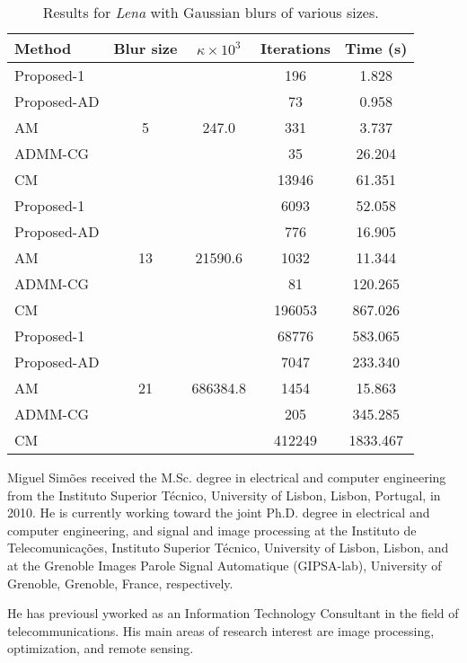 \documentclass[10pt,twocolumn,twoside]{IEEEtran}
\begin{document}
\begin{table}[h]
	\renewcommand{\arraystretch}{1}
	\caption{Results for \textit{Lena} with Gaussian blurs of various sizes.}
	\centering
\begin{tabular}{l|c|c|c|c}
Method &Blur size &$\kappa \times 10^3$ &Iterations &Time (s) \\
\hline
Proposed-1 & \multirow{5}{*}{5} & \multirow{5}{*}{247.0} &  196 & 1.828  \\
Proposed-AD & & &   73 & 0.958 \\
AM & & &  331 & 3.737 \\
ADMM-CG & & &   35 & 26.204 \\
CM & & & 13946 & 61.351 \\
\hline
Proposed-1 & \multirow{5}{*}{13} & \multirow{5}{*}{21590.6} & 6093 & 52.058  \\
Proposed-AD & & &  776 & 16.905 \\
AM & & & 1032 & 11.344 \\
ADMM-CG & & &   81 & 120.265 \\
CM & & & 196053 & 867.026 \\
\hline
Proposed-1 & \multirow{5}{*}{21} & \multirow{5}{*}{686384.8} & 68776 & 583.065  \\
Proposed-AD & & & 7047 & 233.340 \\
AM & & & 1454 & 15.863 \\
ADMM-CG & & &  205 & 345.285 \\
CM & & & 412249 & 1833.467 \\
\hline
\end{tabular}
\end{table}





\ifCLASSOPTIONcaptionsoff
  \newpage
\fi










\begin{IEEEbiography}{Miguel Sim\~{o}es}
	received the M.Sc. degree in electrical and computer engineering from the Instituto Superior T\'{e}cnico, University of Lisbon, Lisbon, Portugal, in 2010. He is currently working toward the joint Ph.D. degree in electrical and computer engineering, and signal and image processing at the Instituto de Telecomunica\c{c}\~{o}es, Instituto Superior T\'{e}cnico, University of Lisbon, Lisbon, and at the Grenoble Images Parole Signal Automatique (GIPSA-lab), University of Grenoble, Grenoble, France, respectively.

	He has previousl yworked as an Information Technology Consultant in the field of telecommunications. His main areas of research interest are image processing, optimization, and remote sensing.
\end{IEEEbiography}
\end{document}
